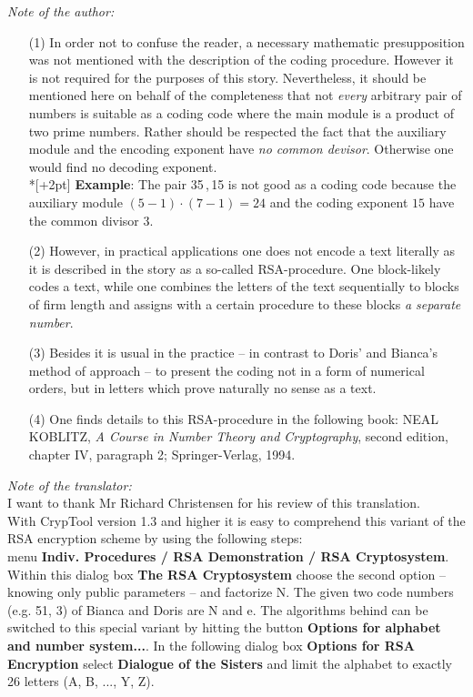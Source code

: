 \noindent
{\em Note of the author:\/}
\begin{itemize}
\item[(1)] In order not to confuse the reader, a necessary mathematic
  presupposition was not mentioned with the description of the coding
  procedure.  However it is not required for the purposes of this story.
  Nevertheless, it should be mentioned here on behalf of the completeness
  that not {\em every\/} arbitrary pair of numbers is suitable as a coding
  code where the main module is a product of two prime numbers.  Rather
  should be respected the fact that the auxiliary module and the encoding
  exponent have {\em no common devisor\/}.
  Otherwise one would find no decoding exponent. \\*[+2pt]
  {\bf Example}: The pair 35\,,\,15 is not good as a coding code
  because the auxiliary module \((5-1) \cdot (7-1) =24\) and the coding
  exponent \(15\) have the common divisor \(3\).
\item[(2)] However, in practical applications one does not encode a text literally
as it is described in the story as a so-called RSA-procedure.  One
block-likely codes a text, while one combines the letters of the text
sequentially to blocks of firm length and assigns with a certain procedure
to these blocks {\em a separate number\/}.

\item[(3)] Besides it is usual in the practice -- in contrast to Doris' and
Bianca's method of approach -- to present the coding not in a form of
numerical orders, but in letters which prove naturally no sense as a text.

\item[(4)] One finds details to this RSA-procedure in the following book: {\small
  NEAL KOBLITZ}, {\em A Course in Number Theory and Cryptography\/},
second edition, chapter IV, paragraph 2; Springer-Verlag, 1994. \\
\end{itemize}
\[\]
\hrulefill
\[\]
\[\]
{\em Note of the translator:} \\
I want to thank Mr Richard Christensen for his review of this translation.
\\[1ex]
With CrypTool version 1.3 and higher it is easy to comprehend this variant of the RSA encryption scheme by using 
the following steps: \\
menu {\bf Indiv. Procedures / RSA Demonstration / RSA Cryptosystem}. Within this dialog box 
{\bf The RSA Cryptosystem} choose the second option -- knowing only public parameters -- and factorize N. The given 
two code numbers (e.g. 51, 3) of Bianca and Doris are N and e. The algorithms behind can be switched to this 
special variant by hitting the button \textbf{Options for alphabet and number system...}. In the following dialog 
box {\bf Options for RSA Encryption} select \textbf{Dialogue of the Sisters} and limit the alphabet to exactly 26 
letters (A, B, ..., Y, Z).





